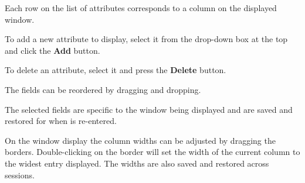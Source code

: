 Each row on the list of attributes corresponds to a column on the displayed window.

To add a new attribute to display, select it from the drop-down box at the top and click the \textbf{Add} button.

To delete an attribute, select it and press the \textbf{Delete} button.

The fields can be reordered by dragging and dropping.

The selected fields are specific to the window being displayed and are saved and restored for when  is re-entered.

On the window display the column widths can be adjusted by dragging the borders. Double-clicking on the border will set the width of the
current column to the widest entry displayed. The widths are also saved and restored across  sessions.

